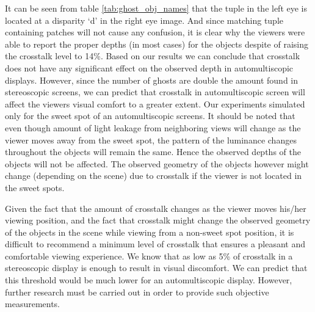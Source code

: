 It can be seen from table \ref{tab:ghost_obj_names} that the tuple in the left eye is located at a disparity `d' in the right eye image. And since matching tuple containing patches will not cause any confusion, it is clear why the viewers were able to report the proper depths (in most cases) for the objects despite of raising the crosstalk level to 14\%. Based on our results we can conclude that crosstalk does not have any significant effect on the observed depth in automultiscopic displays. However, since the number of ghosts are double the amount found in stereoscopic screens, we can predict that crosstalk in automultiscopic screen will affect the viewers visual comfort to a greater extent. Our experiments simulated only for the sweet spot of an automultiscopic screens. It should be noted that even though amount of light leakage from neighboring views will change as the viewer moves away from the sweet spot, the pattern of the luminance changes throughout the objects will remain the same. Hence the observed depths of the objects will not be affected. The observed geometry of the objects however might change (depending on the scene) due to crosstalk if the viewer is not located in the sweet spots.

Given the fact that the amount of crosstalk changes as the viewer moves his/her viewing position, and the fact that crosstalk might change the observed geometry of the objects in the scene while viewing from a non-sweet spot position, it is difficult to recommend a minimum level of crosstalk that ensures a pleasant and comfortable viewing experience. We know that as low as 5\% of crosstalk in a stereoscopic display is enough to result in visual discomfort. We can predict that this threshold would be much lower for an automultiscopic display. However, further research must be carried out in order to provide such objective measurements.

